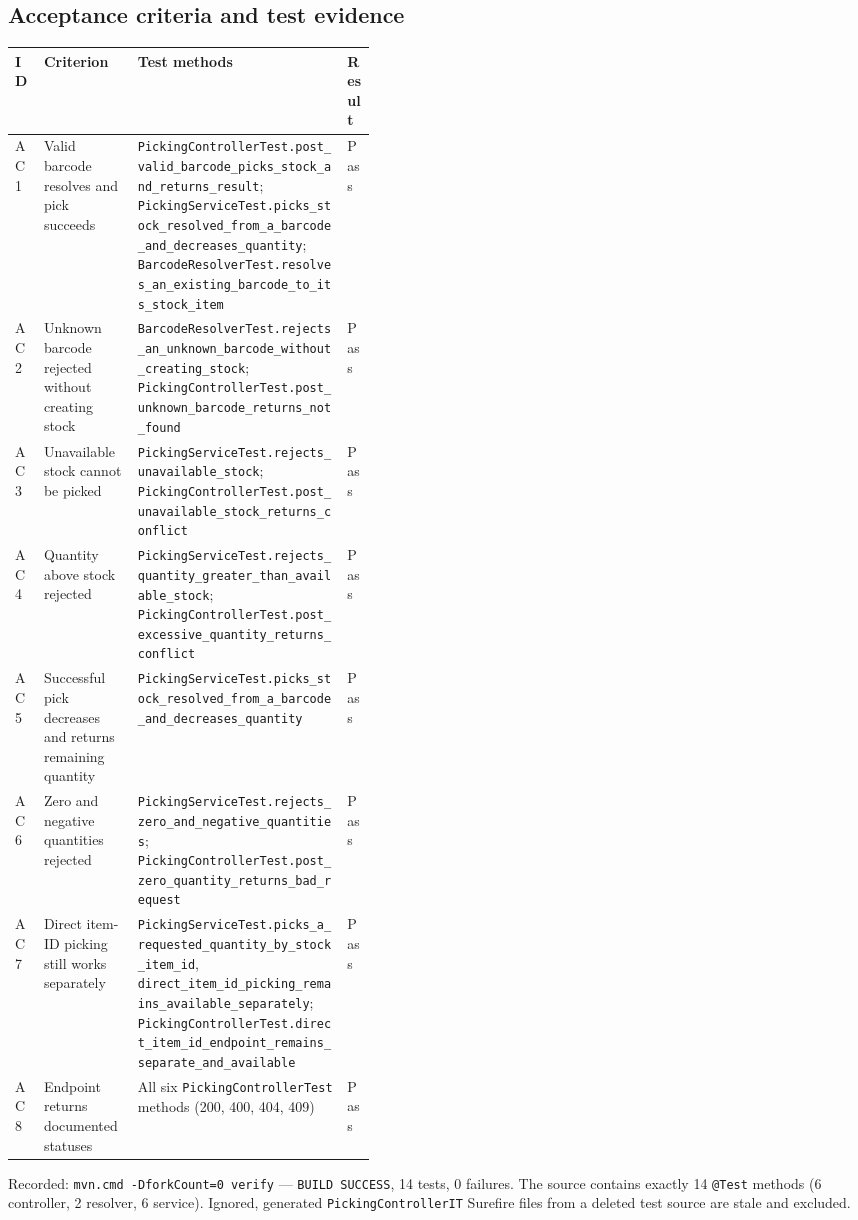 \documentclass[11pt,a4paper]{article}
\newcommand{\code}[1]{\nolinkurl{#1}}
\begin{document}
\subsection{Acceptance criteria and test evidence}
\begin{tabularx}{\linewidth}{@{}P{0.08\linewidth}P{0.26\linewidth}YP{0.08\linewidth}@{}}
\toprule
ID & Criterion & Test methods & Result\\
\midrule
AC1 & Valid barcode resolves and pick succeeds & \code{PickingControllerTest.post_valid_barcode_picks_stock_and_returns_result}; \code{PickingServiceTest.picks_stock_resolved_from_a_barcode_and_decreases_quantity}; \code{BarcodeResolverTest.resolves_an_existing_barcode_to_its_stock_item} & Pass\\
AC2 & Unknown barcode rejected without creating stock & \code{BarcodeResolverTest.rejects_an_unknown_barcode_without_creating_stock}; \code{PickingControllerTest.post_unknown_barcode_returns_not_found} & Pass\\
AC3 & Unavailable stock cannot be picked & \code{PickingServiceTest.rejects_unavailable_stock}; \code{PickingControllerTest.post_unavailable_stock_returns_conflict} & Pass\\
AC4 & Quantity above stock rejected & \code{PickingServiceTest.rejects_quantity_greater_than_available_stock}; \code{PickingControllerTest.post_excessive_quantity_returns_conflict} & Pass\\
AC5 & Successful pick decreases and returns remaining quantity & \code{PickingServiceTest.picks_stock_resolved_from_a_barcode_and_decreases_quantity} & Pass\\
AC6 & Zero and negative quantities rejected & \code{PickingServiceTest.rejects_zero_and_negative_quantities}; \code{PickingControllerTest.post_zero_quantity_returns_bad_request} & Pass\\
AC7 & Direct item-ID picking still works separately & \code{PickingServiceTest.picks_a_requested_quantity_by_stock_item_id}, \code{direct_item_id_picking_remains_available_separately}; \code{PickingControllerTest.direct_item_id_endpoint_remains_separate_and_available} & Pass\\
AC8 & Endpoint returns documented statuses & All six \code{PickingControllerTest} methods (200, 400, 404, 409) & Pass\\
\bottomrule
\end{tabularx}

Recorded: \code{mvn.cmd -DforkCount=0 verify} --- \texttt{BUILD SUCCESS}, 14 tests, 0 failures. The source contains exactly 14 \code{@Test} methods (6 controller, 2 resolver, 6 service). Ignored, generated \code{PickingControllerIT} Surefire files from a deleted test source are stale and excluded.
\end{document}
